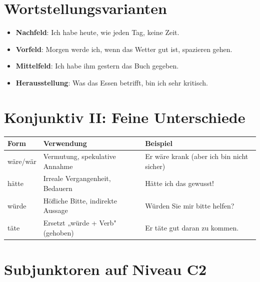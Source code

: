 \section{Wortstellungsvarianten}
\label{sec:C2Wortstellung}

\begin{itemize}
    \item \textbf{Nachfeld}: Ich habe heute, wie jeden Tag, keine Zeit.
    \item \textbf{Vorfeld}: Morgen werde ich, wenn das Wetter gut ist, spazieren gehen.
    \item \textbf{Mittelfeld}: Ich habe ihm gestern das Buch gegeben.
    \item \textbf{Herausstellung}: Was das Essen betrifft, bin ich sehr kritisch.
\end{itemize}

\section{Konjunktiv II: Feine Unterschiede}
\label{sec:C2KonjunktivFein}

\bigskip
\begin{center}
\begin{tabular}{|l|l|p{6cm}|}
\hline
Form & Verwendung & Beispiel \\ \hline
wäre/wär & \begin{minipage}{6cm}Vermutung, spekulative Annahme\end{minipage} & Er wäre krank (aber ich bin nicht sicher) \\ \hline
hätte & \begin{minipage}{6cm}Irreale Vergangenheit, Bedauern\end{minipage} & Hätte ich das gewusst! \\ \hline
würde & \begin{minipage}{6cm}Höfliche Bitte, indirekte Aussage\end{minipage} & Würden Sie mir bitte helfen? \\ \hline
täte & \begin{minipage}{6cm}Ersetzt „würde + Verb" (gehoben)\end{minipage} & Er täte gut daran zu kommen. \\ \hline
\end{tabular}
\end{center}

\section{Subjunktoren auf Niveau C2}
\label{sec:C2Subjunktoren}


